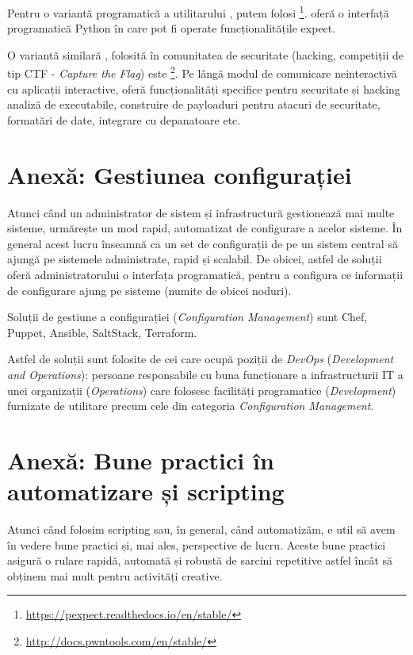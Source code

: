 Pentru o variantă programatică a utilitarului , putem folosi \footnote{\url{https://pexpect.readthedocs.io/en/stable/}}.
 oferă o interfață programatică Python în care pot fi operate funcționalitățile expect.

O variantă similară , folosită în comunitatea de securitate (hacking, competiții de tip CTF - \textit{Capture the Flag}) este \footnote{\url{http://docs.pwntools.com/en/stable/}}.
Pe lângă modul de comunicare neinteractivă cu aplicații interactive,  oferă funcționalități specifice pentru securitate și hacking analiză de executabile, construire de payloaduri pentru atacuri de securitate, formatări de date, integrare cu depanatoare etc.

\section{Anexă: Gestiunea configurației}
\label{sec:auto:config-management}

Atunci când un administrator de sistem și infrastructură gestionează mai multe sisteme, urmărește un mod rapid, automatizat de configurare a acelor sisteme.
În general acest lucru înseamnă ca un set de configurații de pe un sistem central să ajungă pe sistemele administrate, rapid și scalabil.
De obicei, astfel de soluții oferă administratorului o interfața programatică, pentru a configura ce informații de configurare ajung pe sisteme (numite de obicei noduri).

Soluții de gestiune a configurației (\textit{Configuration Management}) sunt Chef, Puppet, Ansible, SaltStack, Terraform.

Astfel de soluții sunt folosite de cei care ocupă poziții de \textit{DevOps} (\textit{Development and Operations}): persoane responsabile cu buna funcționare a infrastructurii IT a unei organizații (\textit{Operations}) care folosesc facilități programatice (\textit{Development}) furnizate de utilitare precum cele din categoria \textit{Configuration Management}.

\section{Anexă: Bune practici în automatizare și scripting}
\label{sec:auto:good-practice}

Atunci când folosim scripting sau, în general, când automatizăm, e util să avem în vedere bune practici și, mai ales, perspective de lucru.
Aceste bune practici asigură o rulare rapidă, automată și robustă de sarcini repetitive astfel încât să obținem mai mult pentru activități creative.

